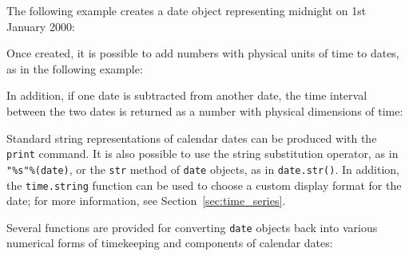 
The following example creates a date object representing midnight on 1st January 2000:

\vspace{3mm}

\vspace{3mm}

Once created, it is possible to add numbers with physical units of time to
dates, as in the following example:

\vspace{3mm}

\vspace{3mm}

\noindent In addition, if one date is subtracted from
another date, the time interval between the two dates is returned as a number
with physical dimensions of time:

\vspace{3mm}

\vspace{3mm}

Standard string representations of calendar dates can be produced with the {\tt
print} command.  It is also possible to use the string substitution operator,
as in {\tt "\%s"\%(date)}, or the {\tt str} method of {\tt date} objects, as in
{\tt date.str()}.  In addition, the {\tt time.string} function can be used to
choose a custom display format for the date; for more information, see
Section~\ref{sec:time_series}.

Several functions are provided for converting {\tt date} objects back into various numerical forms of timekeeping and components of calendar dates:


